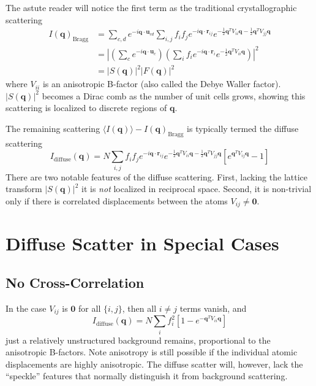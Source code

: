 \documentclass{article}
\begin{document}
The astute reader will notice the first term as the traditional crystallographic scattering
\begin{align}
I(\mathbf{q})_{\mathrm{Bragg}} &=
\sum\limits_{c, d} e^{-i \mathbf{q} \cdot \mathbf{u}_{c d}} 
\sum\limits_{i,j} f_i f_j e^{-i \mathbf{q} \cdot \mathbf{r}_{ij}} 
e^{
- \frac{1}{2} \mathbf{q}^T V_{ii} \mathbf{q}
- \frac{1}{2} \mathbf{q}^T V_{jj} \mathbf{q}
} \\
%
&= \left| \left( 
\sum_c e^{-i \mathbf{q} \cdot \mathbf{u}_{c}} 
\right) \left(
\sum\limits_{i} f_i e^{-i \mathbf{q} \cdot \mathbf{r}_{i}} 
e^{
- \frac{1}{2} \mathbf{q}^T V_{ii} \mathbf{q}
} \right) \right|^2\\
%
&= \left| S( \mathbf{q} ) \right|^2  \left| F( \mathbf{q} ) \right|^2
\end{align}
where $V_{ii}$ is an anisotropic B-factor (also called the Debye Waller factor). $\left| S( \mathbf{q} ) \right|^2$ becomes a Dirac comb as the number of unit cells grows, showing this scattering is localized to discrete regions of $\mathbf{q}$.

The remaining scattering $\langle I (\mathbf{q}) \rangle - I(\mathbf{q})_{\mathrm{Bragg}}$ is typically termed the diffuse scattering
\[
I_\mathrm{diffuse} (\mathbf{q}) = N \sum\limits_{i,j} f_i f_j e^{-i \mathbf{q} \cdot \mathbf{r}_{ij}} 
%
e^{
- \frac{1}{2} \mathbf{q}^T V_{ii} \mathbf{q}
- \frac{1}{2} \mathbf{q}^T V_{jj} \mathbf{q}
}
%
\left[ 
e^{\mathbf{q}^T V_{ij} \mathbf{q}} - 1
\right]
\]
There are two notable features of the diffuse scattering. First, lacking the lattice transform $\left| S( \mathbf{q} ) \right|^2$ it is \textit{not} localized in reciprocal space. Second, it is non-trivial only if there is correlated displacements between the atoms $V_{ij} \neq \mathbf{0}$.

\section{Diffuse Scatter in Special Cases}

\subsection{No Cross-Correlation}
In the case $V_{ij}$ is $\mathbf{0}$ for all $\{i, j\}$, then all $i \neq j$ terms vanish, and
\[
I_\mathrm{diffuse} (\mathbf{q}) = N \sum_{i} f_i^2
%
\left[ 
1 - e^{- \mathbf{q}^T V_{ii} \mathbf{q}}
\right]
\]
just a relatively unstructured background remains, proportional to the anisotropic B-factors. Note anisotropy is still possible if the individual atomic displacements are highly anisotropic. The diffuse scatter will, however, lack the ``speckle'' features that normally distinguish it from background scattering.
\end{document}
